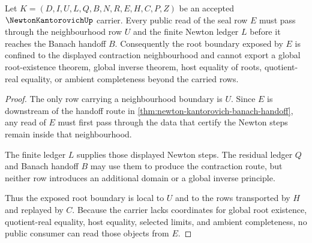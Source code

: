 \begin{theorem}
\label{thm:newton-kantorovich-nonescape-boundary}
Let $K=(D,I,U,L,Q,B,N,R,E,H,C,P,Z)$ be an accepted $\NewtonKantorovichUp$ carrier. Every public read of the seal row $E$ must pass through the neighbourhood row $U$ and the finite Newton ledger $L$ before it reaches the Banach handoff $B$. Consequently the root boundary exposed by $E$ is confined to the displayed contraction neighbourhood and cannot export a global root-existence theorem, global inverse theorem, host equality of roots, quotient-real equality, or ambient completeness beyond the carried rows.
\end{theorem}
\begin{proof}
The only row carrying a neighbourhood boundary is $U$. Since $E$ is downstream of the handoff route in \autoref{thm:newton-kantorovich-banach-handoff}, any read of $E$ must first pass through the data that certify the Newton steps remain inside that neighbourhood.

The finite ledger $L$ supplies those displayed Newton steps. The residual ledger $Q$ and Banach handoff $B$ may use them to produce the contraction route, but neither row introduces an additional domain or a global inverse principle.

Thus the exposed root boundary is local to $U$ and to the rows transported by $H$ and replayed by $C$. Because the carrier lacks coordinates for global root existence, quotient-real equality, host equality, selected limits, and ambient completeness, no public consumer can read those objects from $E$.
\end{proof}




